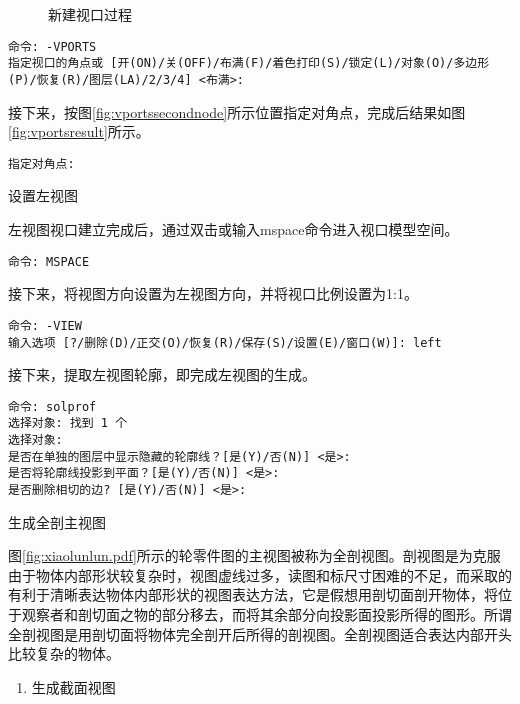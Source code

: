 \begin{procedure}
\begin{figure}[htbp]
\centering
{}\hspace{20pt}
\hspace{20pt}
\caption{新建视口过程}
\end{figure}
\begin{lstlisting}
命令: -VPORTS
指定视口的角点或 [开(ON)/关(OFF)/布满(F)/着色打印(S)/锁定(L)/对象(O)/多边形(P)/恢复(R)/图层(LA)/2/3/4] <布满>:
\end{lstlisting}
接下来，按图\ref{fig:vportssecondnode}所示位置指定对角点，完成后结果如图\ref{fig:vportsresult}所示。
\begin{lstlisting}
指定对角点:
\end{lstlisting}

\item 设置左视图

左视图视口建立完成后，通过双击或输入mspace命令进入视口模型空间。
\begin{lstlisting}
命令: MSPACE
\end{lstlisting}

接下来，将视图方向设置为左视图方向，并将视口比例设置为1:1。
\begin{lstlisting}
命令: -VIEW
输入选项 [?/删除(D)/正交(O)/恢复(R)/保存(S)/设置(E)/窗口(W)]: left
\end{lstlisting}

接下来，提取左视图轮廓，即完成左视图的生成。
\begin{lstlisting}
命令: solprof
选择对象: 找到 1 个
选择对象:
是否在单独的图层中显示隐藏的轮廓线？[是(Y)/否(N)] <是>:
是否将轮廓线投影到平面？[是(Y)/否(N)] <是>:
是否删除相切的边? [是(Y)/否(N)] <是>:
\end{lstlisting}

\item 生成全剖主视图

图\ref{fig:xiaolunlun.pdf}所示的轮零件图的主视图被称为全剖视图。剖视图是为克服由于物体内部形状较复杂时，视图虚线过多，读图和标尺寸困难的不足，而采取的有利于清晰表达物体内部形状的视图表达方法，它是假想用剖切面剖开物体，将位于观察者和剖切面之物的部分移去，而将其余部分向投影面投影所得的图形。所谓全剖视图是用剖切面将物体完全剖开后所得的剖视图。全剖视图适合表达内部开头比较复杂的物体。
\begin{enumerate}
\item 生成截面视图


\end{enumerate}
\end{procedure}
